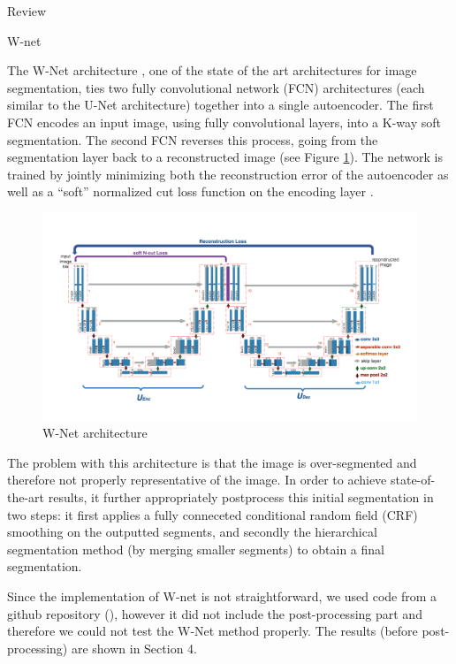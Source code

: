 \documentclass{article}
\begin{document}
\begin{ssection}{Review}

	\begin{ssubsection}{W-net}

		The W-Net architecture \citep{wnet}, one of the state of the art architectures for image segmentation, ties two fully convolutional network (FCN) architectures (each similar to the U-Net architecture) together into a single autoencoder. The first FCN encodes an input image, using fully convolutional layers, into a K-way soft segmentation. The second FCN reverses this process, going from the segmentation layer back to a reconstructed image (see Figure \ref{fig:wnet}). The network is trained by jointly minimizing both the reconstruction error of the autoencoder as well as a “soft” normalized cut loss function on the encoding layer \citep{wnet}.

		\begin{figure}[htpb]
			\centering
			\includegraphics[width=0.8\linewidth]{includes/wnet-arch.png}
			\caption{W-Net architecture}
			\label{fig:wnet}
		\end{figure}

		The problem with this architecture is that the image is over-segmented and therefore not properly representative of the image. In order to achieve state-of-the-art results, it further appropriately postprocess this initial segmentation in two steps: it first applies a fully conneceted conditional random field (CRF) smoothing on the outputted segments, and secondly the hierarchical segmentation method (by merging smaller segments) to obtain a final segmentation.

		Since the implementation of W-net is not straightforward, we used code from a github repository (\hyperlink{}{}), however it did not include the post-processing part and therefore we could not test the W-Net method properly. The results (before post-processing) are shown in Section 4.


\end{ssubsection}
\end{ssection}
\end{document}

